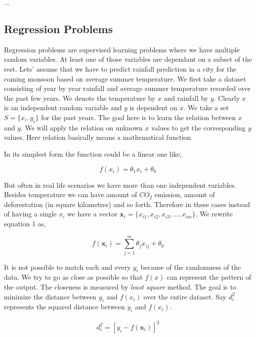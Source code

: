 \documentclass[english]{tktltiki}
\begin{document}
...

\subsection{Regression Problems}

Regression problems are supervised learning problems where we have multiple random variables. At least one of those variables are dependant on a subset of the rest. Lets' assume that we have to predict rainfall prediction in a city for the coming monsoon based on average summer temperature. We first take a dataset consisting of year by year rainfall and average summer temperature recorded over the past few years. We denote the temperature by $x$ and rainfall by $y$. Clearly $x$ is an independent random variable and $y$ is dependent on $x$. We take a set $S = \{x_i, y_i\}$ for the past years. The goal here is to learn the relation between $x$ and $y$. We will apply the relation on unknown $x$ values to get the corresponding $y$ values. Here relation basically means a mathematical function.

In its simplest form the function could be a linear one like,

\begin{equation}
f(x_i) = \theta_1 x_i + \theta_0
\end{equation}


But often in real life scenarios we have more than one independent variables. Besides temperature we can have amount of $CO_2$ emission, amount of deforestation (in square kilometres) and so forth. Therefore in these cases instead of having a single $x_i$ we have a vector $\mathbf{x}_i = \{x_{i1}, x_{i2}, x_{i3}, ..., x_{im}\}$. We rewrite equation 1 as,

\begin{equation}
f(\mathbf{x}_i) = \sum_{j=1}^m \theta_j x_{ij} + \theta_0
\end{equation}

It is not possible to match each and every $y_i$ because of the randomness of the data. We try to go as close as possible so that $f(x)$ can represent the pattern of the output. The closeness is measured by \textit{least square} method. The goal is to minimize the distance between $y_i$ and $f(x_i)$ over the entire dataset. Say $d^2_i$ represents the squared distance between $y_i$ and $f(x_i)$.

\begin{eqnarray}
d^2_i = [y_i - f(\mathbf{x}_i)]^2
\end{eqnarray}
\end{document}
